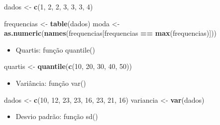 \documentclass[
]{book}
\newenvironment{Shaded}{\begin{snugshade}}{\end{snugshade}}
\newcommand{\DecValTok}[1]{\textcolor[rgb]{0.00,0.00,0.81}{#1}}
\newcommand{\FunctionTok}[1]{\textcolor[rgb]{0.13,0.29,0.53}{\textbf{#1}}}
\newcommand{\NormalTok}[1]{#1}
\newcommand{\OtherTok}[1]{\textcolor[rgb]{0.56,0.35,0.01}{#1}}
\newcommand{\SpecialCharTok}[1]{\textcolor[rgb]{0.81,0.36,0.00}{\textbf{#1}}}
\providecommand{\tightlist}{%
  \setlength{\itemsep}{0pt}\setlength{\parskip}{0pt}}
\begin{document}
\begin{Shaded}
\begin{Highlighting}[]
\NormalTok{dados }\OtherTok{\textless{}{-}} \FunctionTok{c}\NormalTok{(}\DecValTok{1}\NormalTok{, }\DecValTok{2}\NormalTok{, }\DecValTok{2}\NormalTok{, }\DecValTok{3}\NormalTok{, }\DecValTok{3}\NormalTok{, }\DecValTok{3}\NormalTok{, }\DecValTok{4}\NormalTok{)}

\NormalTok{frequencias }\OtherTok{\textless{}{-}} \FunctionTok{table}\NormalTok{(dados)}
\NormalTok{moda }\OtherTok{\textless{}{-}} \FunctionTok{as.numeric}\NormalTok{(}\FunctionTok{names}\NormalTok{(frequencias[frequencias }\SpecialCharTok{==} \FunctionTok{max}\NormalTok{(frequencias)]))}
\end{Highlighting}
\end{Shaded}

\begin{itemize}
\tightlist
\item
  Quartis: função quantile()
\end{itemize}

\begin{Shaded}
\begin{Highlighting}[]
\NormalTok{quartis }\OtherTok{\textless{}{-}} \FunctionTok{quantile}\NormalTok{(}\FunctionTok{c}\NormalTok{(}\DecValTok{10}\NormalTok{, }\DecValTok{20}\NormalTok{, }\DecValTok{30}\NormalTok{, }\DecValTok{40}\NormalTok{, }\DecValTok{50}\NormalTok{))}
\end{Highlighting}
\end{Shaded}

\begin{itemize}
\tightlist
\item
  Variância: função var()
\end{itemize}

\begin{Shaded}
\begin{Highlighting}[]
\NormalTok{dados }\OtherTok{\textless{}{-}} \FunctionTok{c}\NormalTok{(}\DecValTok{10}\NormalTok{, }\DecValTok{12}\NormalTok{, }\DecValTok{23}\NormalTok{, }\DecValTok{23}\NormalTok{, }\DecValTok{16}\NormalTok{, }\DecValTok{23}\NormalTok{, }\DecValTok{21}\NormalTok{, }\DecValTok{16}\NormalTok{)}
\NormalTok{variancia }\OtherTok{\textless{}{-}} \FunctionTok{var}\NormalTok{(dados)}
\end{Highlighting}
\end{Shaded}

\begin{itemize}
\tightlist
\item
  Desvio padrão: função sd()
\end{itemize}
\end{document}
